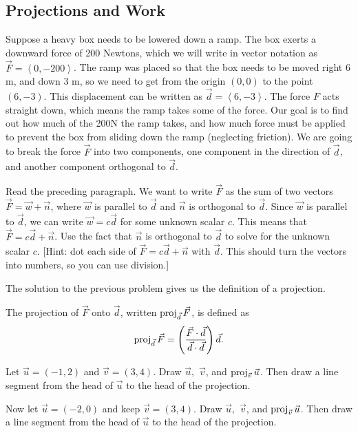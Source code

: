 \subsection{Projections and Work}
Suppose a heavy box needs to be lowered down a ramp.  
The box exerts a downward force of 200 Newtons, which we will write in vector notation as $\vec F=\left<0,-200\right>$. 
The ramp was placed so that the box needs to be moved right 6 m, and down 3 m, so we need to get from the origin $(0,0)$ to the point $(6,-3)$.  This displacement can be written as $\vec d=\left<6,-3\right>$. The force $F$ acts straight down, which means the ramp takes some of the force. Our goal is to find out how much of the 200N the ramp takes, and how much force must be applied to prevent the box from sliding down the ramp (neglecting friction). We are going to break the force $\vec F$ into two components, one component in the direction of $\vec d$, and another component orthogonal to $\vec d$. 

\begin{problem}\label{force intro}
Read the preceding paragraph. We want to write $\vec F$ as the sum of two vectors $\vec F = \vec w+\vec n$, where $\vec w$ is parallel to $\vec d$ and $\vec n$ is orthogonal to $\vec d$.
Since $\vec w$ is parallel to $\vec d$, we can write $\vec w=c\vec d$ for some unknown scalar $c$.
This means that $\vec F=c\vec d+\vec n$.  Use the fact that $\vec n$ is orthogonal to $\vec d$ to solve for the unknown scalar $c$.  [Hint:  dot each side of $\vec F=c\vec d+\vec n$ with $\vec d$. This should turn the vectors into numbers, so you can use division.]
\end{problem}
The solution to the previous problem gives us the definition of a projection.
\begin{definition}
The projection of $\vec F$ onto $\vec d$, written $\operatorname{proj}_{\vec d}\vec F$, is defined as $$\operatorname{proj}_{\vec d}\vec F = \left(\frac{\vec F\cdot \vec d}{\vec d\cdot \vec d}\right)\vec d.$$
\end{definition}

\begin{problem} 
Let $\vec u=(-1,2)$ and $\vec v=(3,4)$. Draw $\vec u,$ $\vec v$, and $\operatorname{proj}_{\vec v}\vec u$. Then draw a line segment from the head of $\vec u$ to the head of the projection.

Now let $\vec u=(-2,0)$ and keep $\vec v=(3,4)$. Draw $\vec u,$ $\vec v$, and $\operatorname{proj}_{\vec v}\vec u$. Then draw a line segment from the head of $\vec u$ to the head of the projection.

\end{problem}

